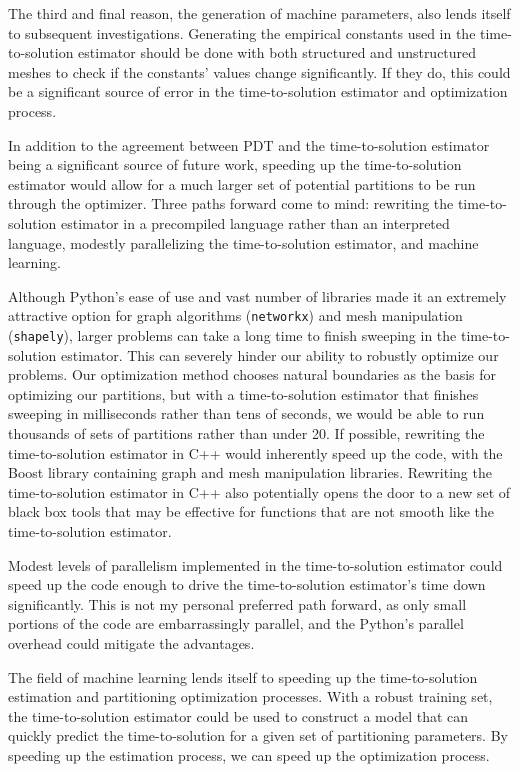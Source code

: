 The third and final reason, the generation of machine parameters, also lends itself to subsequent investigations.
Generating the empirical constants used in the time-to-solution estimator should be done with both structured and unstructured meshes to check if the constants' values change significantly.
If they do, this could be a significant source of error in the time-to-solution estimator and optimization process.

In addition to the agreement between PDT and the time-to-solution estimator being a significant source of future work, speeding up the time-to-solution estimator would allow for a much larger set of potential partitions to be run through the optimizer.
Three paths forward come to mind: rewriting the time-to-solution estimator in a precompiled language rather than an interpreted language, modestly parallelizing the time-to-solution estimator, and machine learning.

Although Python's ease of use and vast number of libraries made it an extremely attractive option for graph algorithms ({\tt networkx}) and mesh manipulation ({\tt shapely}), larger problems can take a long time to finish sweeping in the time-to-solution estimator.
This can severely hinder our ability to robustly optimize our problems.
Our optimization method chooses natural boundaries as the basis for optimizing our partitions, but with a time-to-solution estimator that finishes sweeping in milliseconds rather than tens of seconds, we would be able to run thousands of sets of partitions rather than under 20.
If possible, rewriting the time-to-solution estimator in C++ would inherently speed up the code, with the Boost library containing graph and mesh manipulation libraries.
Rewriting the time-to-solution estimator in C++ also potentially opens the door to a new set of black box tools that may be effective for functions that are not smooth like the time-to-solution estimator.

Modest levels of parallelism implemented in the time-to-solution estimator could speed up the code enough to drive the time-to-solution estimator's time down significantly.
This is not my personal preferred path forward, as only small portions of the code are embarrassingly parallel, and the Python's parallel overhead could mitigate the advantages.

The field of machine learning lends itself to speeding up the time-to-solution estimation and partitioning optimization processes.
With a robust training set, the time-to-solution estimator could be used to construct a model that can quickly predict the time-to-solution for a given set of partitioning parameters.
By speeding up the estimation process, we can speed up the optimization process. 
